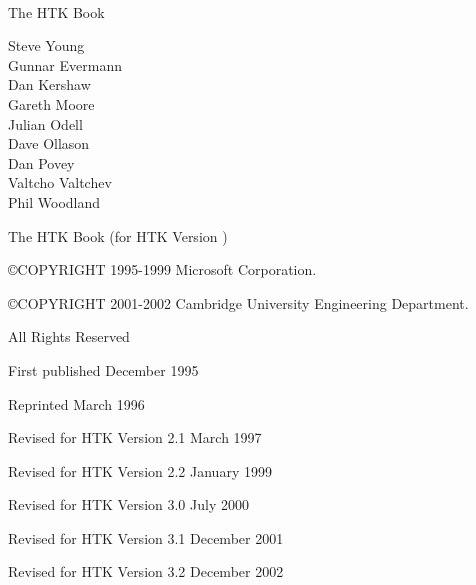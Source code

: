 \documentclass[a4paper,oneside]{book}
\begin{document}
\newlength{\saveindent}
\setlength{\saveindent}{\parindent}



{ \Large \ \\

\vspace{1cm}

\noindent The HTK Book

\vspace{1cm}

\noindent Steve Young \\
\noindent Gunnar Evermann \\
\noindent Dan Kershaw \\
\noindent Gareth Moore \\
\noindent Julian Odell \\
\noindent Dave Ollason \\
\noindent Dan Povey \\
\noindent Valtcho Valtchev \\
\noindent Phil Woodland \\

\vspace{1cm}

\noindent The HTK Book (for HTK Version \version)

\vspace{1.5cm}

\noindent \copyright COPYRIGHT 1995-1999 Microsoft Corporation. 

\noindent \copyright COPYRIGHT 2001-2002 Cambridge University Engineering Department. 

\vspace{0.2cm}

\noindent All Rights Reserved

\vspace{1.5cm}

\noindent First published December 1995
\vspace{0.2cm}

\noindent Reprinted March 1996 
\vspace{0.2cm}

\noindent Revised for HTK Version 2.1 March 1997 
\vspace{0.2cm}

\noindent Revised for HTK Version 2.2 January 1999 
\vspace{0.2cm}

\noindent Revised for HTK Version 3.0 July 2000 
\vspace{0.2cm}

\noindent Revised for HTK Version 3.1 December 2001
\vspace{0.2cm}

\noindent Revised for HTK Version 3.2 December 2002
\vspace{0.2cm}

}
\end{document}
